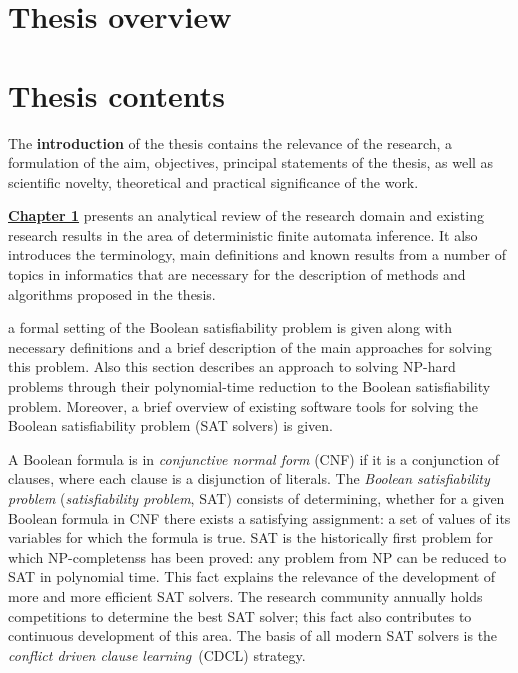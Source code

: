 
\section*{Thesis overview}



\section*{Thesis contents}

The \textbf{introduction} of the thesis contains the relevance of the research, a formulation of the aim, objectives, principal statements of the thesis, as well as scientific novelty, theoretical and practical significance of the work.

\textbf{\underline{Chapter 1}} presents an analytical review of the research domain and existing research results in the area of deterministic finite automata inference.
It also introduces the terminology, main definitions and known results from a number of topics in informatics that are necessary for the description of methods and algorithms proposed in the thesis.

\insectionen{\ref{sec:review:sat}} a formal setting of the Boolean satisfiability problem is given along with necessary definitions and
a brief description of the main approaches for solving this problem.
Also this section describes an approach to solving NP-hard problems through their polynomial-time reduction to the Boolean satisfiability problem.
Moreover, a brief overview of existing software tools for solving the Boolean satisfiability problem (SAT solvers) is given.

A Boolean formula is in \emph{conjunctive normal form} (CNF) if it is a conjunction of clauses, where each clause is a disjunction 
of literals.
The \emph{Boolean satisfiability problem} (\emph{satisfiability problem}, SAT) consists of determining, whether for a given Boolean formula in CNF there exists a satisfying assignment: a set of values of its variables for which the formula is true.
SAT is the historically first problem for which NP-completenss has been proved: any problem from NP can be reduced to SAT in polynomial time.
This fact explains the relevance of the development of more and more efficient SAT solvers.
The research community annually holds competitions to determine the best SAT solver; this fact also contributes to continuous development of this area.
The basis of all modern SAT solvers is the \emph{conflict driven clause learning}~(CDCL) strategy.

